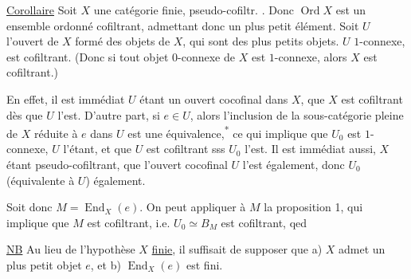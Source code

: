 
\uline{Corollaire} Soit $X$ une catégorie finie, pseudo-cofiltr. . Donc $\operatorname{Ord} X$ est un ensemble ordonné cofiltrant, admettant donc un plus petit élément. Soit $U$ l'ouvert de $X$ formé des objets de $X$, qui sont des plus petits objets.   $U$ $1$-connexe,   est cofiltrant. (Donc si tout objet $0$-connexe de $X$ est $1$-connexe, alors $X$ est cofiltrant.)

En effet, il est immédiat  $U$ étant un ouvert cocofinal dans $X$,  que $X$ est cofiltrant dès que $U$ l'est. D'autre part, si $e\in U$, alors l'inclusion de la sous-catégorie pleine  de $X$ réduite à $e$ dans $U$ est une équivalence,\textsuperscript{*} ce qui implique que $U_0$ est $1$-connexe, $U$ l'étant, et que $U$ est cofiltrant sss $U_0$ l'est.
 Il est immédiat aussi, $X$ étant pseudo-cofiltrant, que l'ouvert cocofinal $U$ l'est également, donc $U_0$ (équivalente à $U$) également.

Soit donc $M=\operatorname{End}_X(e)$. On peut appliquer à $M$ la proposition 1, qui implique que $M$ est cofiltrant, i.e. $U_0\simeq B_M$ est cofiltrant, qed

\uline{NB} Au lieu de l'hypothèse $X$ \uline{finie}, il suffisait de supposer que a) $X$ admet un plus petit objet $e$, et b) $\operatorname{End}_X(e)$ est fini.
